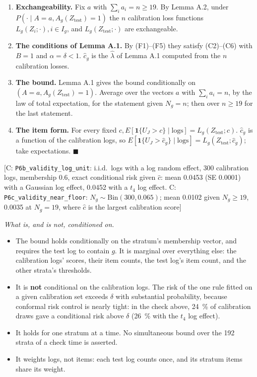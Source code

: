 \documentclass{ieeeaccess}
\begin{document}
\begin{enumerate}
\item[1.] \textbf{Exchangeability.} Fix $a$ with $\sum_{i} a_{i} = n \geq 19$. By Lemma A.2, under $P(\cdot \mid A = a, A_{g}(Z_{\mathrm{test}}) = 1)$ the $n$ calibration loss functions $L_{g}(Z_{i}; \cdot), i \in I_{g}$, and $L_{g}(Z_{\mathrm{test}}; \cdot)$ are exchangeable.
\item[2.] \textbf{The conditions of Lemma A.1.} By (F1)--(F5) they satisfy (C2)--(C6) with $B = 1$ and $\alpha = \delta < 1$. $\hat{c}_{g}$ is the $\hat{\lambda}$ of Lemma A.1 computed from the $n$ calibration losses.
\item[3.] \textbf{The bound.} Lemma A.1 gives the bound conditionally on $(A = a, A_{g}(Z_{\mathrm{test}}) = 1)$. Average over the vectors $a$ with $\sum_{i} a_{i} = n$, by the law of total expectation, for the statement given $N_{g} = n$; then over $n \geq 19$ for the last statement.
\item[4.] \textbf{The item form.} For every fixed $c, E[\mathbf{1}\{U_J > c\} \mid \text{logs}] = L_{g}(Z_{\mathrm{test}}; c)$. $\hat{c}_{g}$ is a function of the calibration logs, so $E[\mathbf{1}\{U_J > \hat{c}_g\} \mid \text{logs}] = L_{g}(Z_{\mathrm{test}}; \hat{c}_{g})$; take expectations. $\blacksquare$
\end{enumerate}

[C: \texttt{P6b\_validity\_log\_unit}: i.i.d.\ logs with a log random effect, 300 calibration logs, membership 0.6, exact conditional risk given $\hat{c}$: mean 0.0453 (SE 0.0001) with a Gaussian log effect, 0.0452 with a $t_{4}$ log effect. C: \texttt{P6c\_validity\_near\_floor}: $N_{g} \sim \mathrm{Bin}(300, 0.065)$; mean 0.0102 given $N_{g} \geq 19$, 0.0035 at $N_{g} = 19$, where $\hat{c}$ is the largest calibration score]

\emph{What is, and is not, conditioned on.}

\begin{itemize}
\item The bound holds conditionally on the stratum's membership vector, and requires the test log to contain $g$. It is marginal over everything else: the calibration logs' scores, their item counts, the test log's item count, and the other strata's thresholds.
\item It is \textbf{not} conditional on the calibration logs. The risk of the one rule fitted on a given calibration set exceeds $\delta$ with substantial probability, because conformal risk control is nearly tight: in the check above, 24~\% of calibration draws gave a conditional risk above $\delta$ (26~\% with the $t_{4}$ log effect).
\item It holds for one stratum at a time. No simultaneous bound over the 192 strata of a check time is asserted.
\item It weights logs, not items: each test log counts once, and its stratum items share its weight.
\end{itemize}
\end{document}
